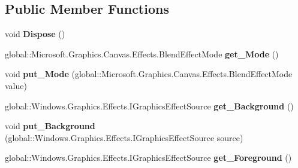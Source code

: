 \subsection*{Public Member Functions}
\begin{DoxyCompactItemize}
\item 
\mbox{\label{class_microsoft_1_1_graphics_1_1_canvas_1_1_effects_1_1_blend_effect_a5d0e95366e1252da3cf90f1d61cd0935}} 
void {\bfseries Dispose} ()
\item 
\mbox{\label{class_microsoft_1_1_graphics_1_1_canvas_1_1_effects_1_1_blend_effect_ab50bbe9eaad5189343a4e0dc8958294a}} 
global\+::\+Microsoft.\+Graphics.\+Canvas.\+Effects.\+Blend\+Effect\+Mode {\bfseries get\+\_\+\+Mode} ()
\item 
\mbox{\label{class_microsoft_1_1_graphics_1_1_canvas_1_1_effects_1_1_blend_effect_ae28d797f3ec0b639d357346a4e2eb258}} 
void {\bfseries put\+\_\+\+Mode} (global\+::\+Microsoft.\+Graphics.\+Canvas.\+Effects.\+Blend\+Effect\+Mode value)
\item 
\mbox{\label{class_microsoft_1_1_graphics_1_1_canvas_1_1_effects_1_1_blend_effect_a8c5401801aebc2069ae548d01680f8a9}} 
global\+::\+Windows.\+Graphics.\+Effects.\+I\+Graphics\+Effect\+Source {\bfseries get\+\_\+\+Background} ()
\item 
\mbox{\label{class_microsoft_1_1_graphics_1_1_canvas_1_1_effects_1_1_blend_effect_abd598b6c76aa0c92ce04d0ec53ec328e}} 
void {\bfseries put\+\_\+\+Background} (global\+::\+Windows.\+Graphics.\+Effects.\+I\+Graphics\+Effect\+Source source)
\item 
\mbox{\label{class_microsoft_1_1_graphics_1_1_canvas_1_1_effects_1_1_blend_effect_a10ccecae64e09d405b1921dc72bcd69d}} 
global\+::\+Windows.\+Graphics.\+Effects.\+I\+Graphics\+Effect\+Source {\bfseries get\+\_\+\+Foreground} ()
\item 
\mbox{\label{class_microsoft_1_1_graphics_1_1_canvas_1_1_effects_1_1_blend_effect_a898a9aa44604170ad7f898b4cc45c084}} 

\end{DoxyCompactItemize}
